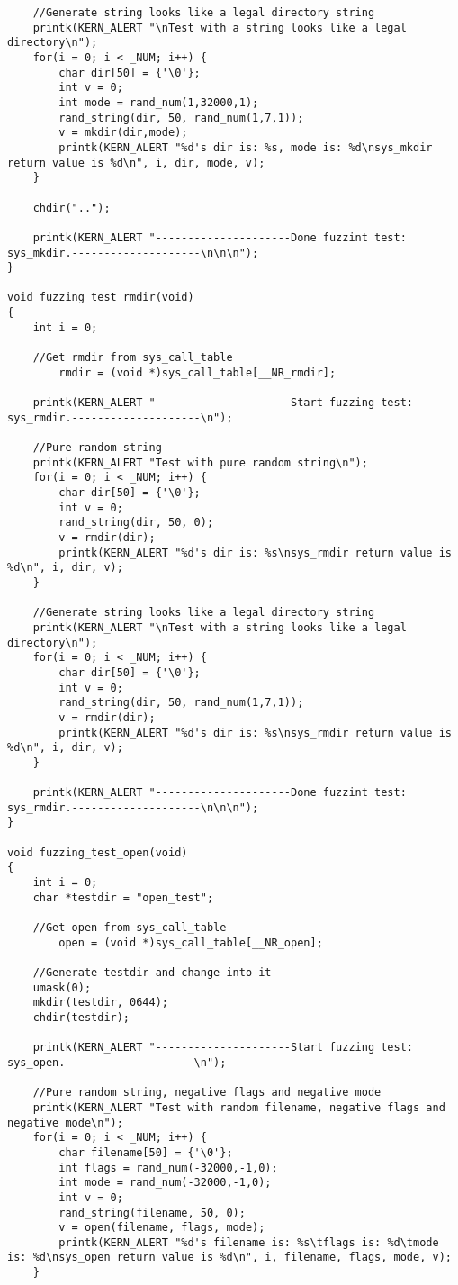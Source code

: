 \documentclass[twoside]{article}
\begin{document}
\begin{lstlisting}
	//Generate string looks like a legal directory string
	printk(KERN_ALERT "\nTest with a string looks like a legal directory\n");
	for(i = 0; i < _NUM; i++) {
		char dir[50] = {'\0'};
		int v = 0;
		int mode = rand_num(1,32000,1);
		rand_string(dir, 50, rand_num(1,7,1));
		v = mkdir(dir,mode);
		printk(KERN_ALERT "%d's dir is: %s, mode is: %d\nsys_mkdir return value is %d\n", i, dir, mode, v);
	}

	chdir("..");
	
	printk(KERN_ALERT "---------------------Done fuzzint test: sys_mkdir.--------------------\n\n\n");
}

void fuzzing_test_rmdir(void)
{
	int i = 0;

	//Get rmdir from sys_call_table
       	rmdir = (void *)sys_call_table[__NR_rmdir];

	printk(KERN_ALERT "---------------------Start fuzzing test: sys_rmdir.--------------------\n");

	//Pure random string
	printk(KERN_ALERT "Test with pure random string\n");
	for(i = 0; i < _NUM; i++) {
		char dir[50] = {'\0'};
		int v = 0;
		rand_string(dir, 50, 0);
		v = rmdir(dir);
		printk(KERN_ALERT "%d's dir is: %s\nsys_rmdir return value is %d\n", i, dir, v);
	}

	//Generate string looks like a legal directory string
	printk(KERN_ALERT "\nTest with a string looks like a legal directory\n");
	for(i = 0; i < _NUM; i++) {
		char dir[50] = {'\0'};
		int v = 0;
		rand_string(dir, 50, rand_num(1,7,1));
		v = rmdir(dir);
		printk(KERN_ALERT "%d's dir is: %s\nsys_rmdir return value is %d\n", i, dir, v);
	}
	
	printk(KERN_ALERT "---------------------Done fuzzint test: sys_rmdir.--------------------\n\n\n");
}

void fuzzing_test_open(void)
{
	int i = 0;
	char *testdir = "open_test";
	
	//Get open from sys_call_table
       	open = (void *)sys_call_table[__NR_open];

	//Generate testdir and change into it
	umask(0);
	mkdir(testdir, 0644);
	chdir(testdir);
	
	printk(KERN_ALERT "---------------------Start fuzzing test: sys_open.--------------------\n");

	//Pure random string, negative flags and negative mode
	printk(KERN_ALERT "Test with random filename, negative flags and negative mode\n");
	for(i = 0; i < _NUM; i++) {
		char filename[50] = {'\0'};
		int flags = rand_num(-32000,-1,0);
		int mode = rand_num(-32000,-1,0);
		int v = 0;
		rand_string(filename, 50, 0);
		v = open(filename, flags, mode);
		printk(KERN_ALERT "%d's filename is: %s\tflags is: %d\tmode is: %d\nsys_open return value is %d\n", i, filename, flags, mode, v);
	}


\end{lstlisting}
\end{document}
